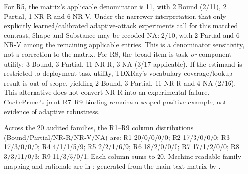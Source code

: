 For R5, the matrix's applicable denominator is 11, with 2 Bound (2/11), 2 Partial, 1 NR-R and 6 NR-V. Under the narrower interpretation that only explicitly learned/calibrated adaptive-attack experiments call for this matched contrast, Shape and Substance may be recoded NA: 2/10, with 2 Partial and 6 NR-V among the remaining applicable entries. This is a denominator sensitivity, not a correction to the matrix. For R8, the broad item is task \emph{or} component utility: 3 Bound, 3 Partial, 11 NR-R, 3 NA (3/17 applicable). If the estimand is restricted to deployment-task utility, TDXRay's vocabulary-coverage/lookup result is out of scope, yielding 2 Bound, 3 Partial, 11 NR-R and 4 NA (2/16). This alternative does not convert NR-R into an experimental failure. CachePrune's joint R7--R9 binding remains a scoped positive example, not evidence of adaptive robustness.

Across the 20 audited families, the R1--R9 column distributions (Bound/Partial/NR-R/NR-V/NA) are: R1 20/0/0/0/0; R2 17/3/0/0/0; R3 17/3/0/0/0; R4 4/1/1/5/9; R5 2/2/1/6/9; R6 18/2/0/0/0; R7 17/1/2/0/0; R8 3/3/11/0/3; R9 11/3/5/0/1. Each column sums to 20. Machine-readable family mapping and rationale are in ; generated from the main-text matrix by .
